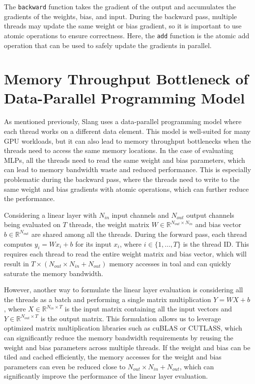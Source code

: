 \documentclass{article}
\begin{document}
The \texttt{backward} function takes the gradient of the output and accumulates the gradients of the weights, bias, and input. During the backward pass, multiple threads may update the same weight or bias gradient, so it is important to use atomic operations to ensure correctness. Here, the \texttt{add} function is the atomic add operation that can be used to safely update the gradients in parallel.

\section{Memory Throughput Bottleneck of Data-Parallel Programming Model}

As mentioned previously, Slang uses a data-parallel programming model where each thread works on a different data element. This model is well-suited for many GPU workloads, but it can also lead to memory throughput bottlenecks when the threads need to access the same memory locations. In the case of evaluating MLPs, all the threads need to read the same weight and bias parameters, which can lead to memory bandwidth waste and reduced performance. This is especially problematic during the backward pass, where the threads need to write to the same weight and bias gradients with atomic operations, which can further reduce the performance.

Considering a linear layer with $N_{in}$ input channels and $N_{out}$ output channels being evaluated on $T$ threads, the weight matrix $W \in \mathbb{R}^{N_{out} \times N_{in}}$ and bias vector $b \in \mathbb{R}^{N_{out}}$ are shared among all the threads. During the forward pass, each thread computes $y_{i} = W x_{i} + b$ for its input $x_{i}$, where $i \in \{1, \ldots, T\}$ is the thread ID. This requires each thread to read the entire weight matrix and bias vector, which will result in $T \times (N_{out} \times N_{in} + N_{out})$ memory accesses in toal and can quickly saturate the memory bandwidth.

However, another way to formulate the linear layer evaluation is considering all the threads as a batch and performing a single matrix multiplication $Y = W X + b$, where $X \in \mathbb{R}^{N_{in} \times T}$ is the input matrix containing all the input vectors and $Y \in \mathbb{R}^{N_{out} \times T}$ is the output matrix. This formulation allows us to leverage optimized matrix multiplication libraries such as cuBLAS or CUTLASS, which can significantly reduce the memory bandwidth requirements by reusing the weight and bias parameters across multiple threads. If the weight and bias can be tiled and cached efficiently, the memory accesses for the weight and bias parameters can even be reduced close to $N_{out} \times N_{in} + N_{out}$, which can significantly improve the performance of the linear layer evaluation.
\end{document}
